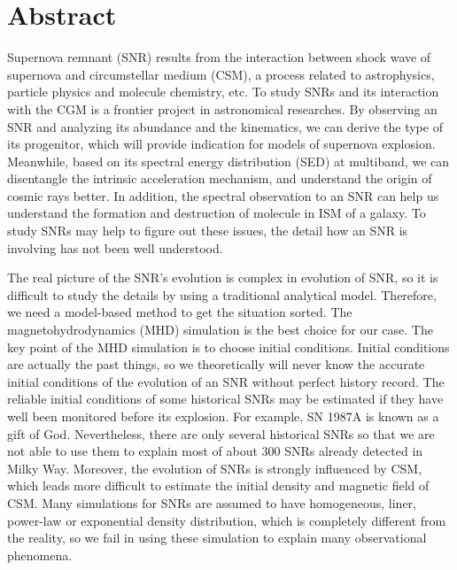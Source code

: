 \chapter*{Abstract}%

Supernova remnant (SNR) results from the interaction between shock wave of supernova
and circumstellar medium (CSM), a process related to astrophysics, particle physics and molecule
chemistry, etc.
To study SNRs and its interaction with the CGM is a frontier project in astronomical
researches.
By observing an SNR and analyzing its abundance and the kinematics, we can derive
the type of its progenitor, which will provide indication for models of supernova explosion.
Meanwhile, based on its spectral energy distribution (SED) at multiband, we can disentangle
the intrinsic acceleration mechanism, and understand the origin of cosmic rays better.
In addition, the spectral observation to an SNR can help us understand the formation
and destruction of molecule in ISM of a galaxy.
To study SNRs may help to figure out these issues, the detail how an SNR is involving has
not been well understood.

The real picture of the SNR's evolution is complex in evolution of SNR, so it is difficult to study
the details by using a traditional analytical model.
Therefore, we need a model-based method to get the situation sorted.
The magnetohydrodynamics (MHD) simulation is the best choice for our case.
The key point of the MHD simulation is to choose initial conditions.
Initial conditions are actually the past things, so we theoretically will never know
the accurate initial conditions of the evolution of an SNR without perfect history record.
The reliable initial conditions of some historical SNRs may be estimated if they have well
been monitored before its explosion.
For example, SN 1987A is known as a gift of God.
Nevertheless, there are only several historical SNRs so that we are not able to use them to explain
most of about 300 SNRs already detected in Milky Way.
Moreover, the evolution of SNRs is strongly influenced by CSM, which leads
 more difficult to estimate the initial density and magnetic field of CSM.
Many simulations for SNRs are assumed to have homogeneous, liner, power-law or
exponential density distribution, which is completely different from the reality, so we fail in
using these simulation to  explain many observational phenomena.

